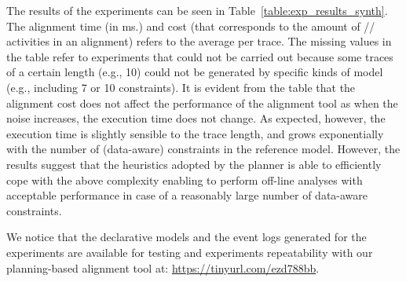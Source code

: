 The results of the experiments can be seen in Table~\ref{table:exp_results_synth}. The alignment time (in ms.) and cost (that corresponds to the amount of // activities in an alignment) refers to the average per trace. The missing values in the table refer to experiments that could not be carried out because
some traces of a certain length (e.g., 10) could not be generated by specific kinds of model (e.g., including 7 or 10 constraints). It is evident from the table that the alignment cost does not affect the performance of the alignment tool as when the noise increases, the execution time does not change. As expected, however, the execution time is slightly sensible to the trace length, and grows exponentially with the number of (data-aware) constraints in the reference model. However, the results suggest that the heuristics adopted by the planner is able to efficiently cope with the above complexity enabling to perform off-line analyses with acceptable performance in case of a reasonably large number of data-aware constraints.

We notice that the declarative models and the event logs generated for the experiments are available for testing and experiments repeatability with our planning-based alignment tool at: \url{https://tinyurl.com/ezd788bb}.

%
%


